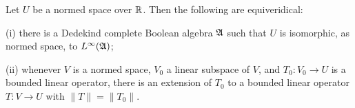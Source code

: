 
 Let $U$ be a normed space over $\Bbb R$.   Then
the following are equiveridical:

(i)  there is a Dedekind complete Boolean algebra $\frak A$ such that
$U$ is isomorphic, as normed space, to $L^{\infty}(\frak A)$;

(ii) whenever $V$ is a normed space, $V_0$ a linear subspace of $V$, and
$T_0:V_0\to U$ is a bounded linear operator, there is an extension of
$T_0$ to a bounded linear operator $T:V\to U$ with $\|T\|=\|T_0\|$.

